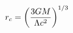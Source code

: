 \documentclass[preview]{standalone}
\begin{document}
\begin{align*}
\special{dvisvgm:raw <g id='unique000'>}r_c = \left(\frac{3GM}{\Lambda c^2}\right)^{1/3}\special{dvisvgm:raw </g>}
\end{align*}
\end{document}

